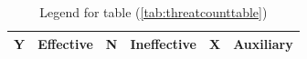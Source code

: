 \documentclass[12pt,english,a4paper]{article}
\begin{document}
 \begin{table}[h]
    \caption{Legend for table (\ref{tab:threatcounttable}) }
    \begin{tabular}{|c|c|c|c|c|c|}
    \hline
    \cellcolor{auxiliryc}Y & Effective & \cellcolor{ineffectivec}N & Ineffective & \cellcolor{effectivec}X & Auxiliary \\ \hline
    \end{tabular}
  \end{table}
 
\newpage
\printbibliography[title={Complete Bibliography},heading=bibintoc]
\end{document}
